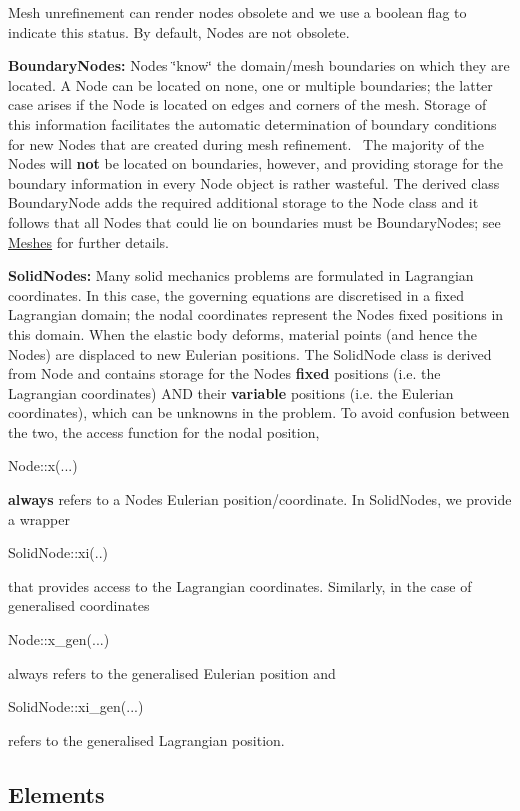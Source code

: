 \begin{DoxyItemize}
\item Mesh unrefinement can render nodes obsolete and we use a boolean flag to indicate this status. By default, {\ttfamily Nodes} are not obsolete.
\item {\bfseries Boundary\+Nodes\+:} {\ttfamily Nodes} \char`\"{}know\char`\"{} the domain/mesh boundaries on which they are located. A {\ttfamily Node} can be located on none, one or multiple boundaries; the latter case arises if the {\ttfamily Node} is located on edges and corners of the mesh. Storage of this information facilitates the automatic determination of boundary conditions for new {\ttfamily Nodes} that are created during mesh refinement.~\newline
 The majority of the {\ttfamily Nodes} will {\bfseries not} be located on boundaries, however, and providing storage for the boundary information in every {\ttfamily Node} object is rather wasteful. The derived class {\ttfamily Boundary\+Node} adds the required additional storage to the {\ttfamily Node} class and it follows that all {\ttfamily Nodes} that could lie on boundaries must be {\ttfamily Boundary\+Nodes}; see \hyperlink{index_meshes}{Meshes} for further details.
\item {\bfseries Solid\+Nodes\+:} Many solid mechanics problems are formulated in Lagrangian coordinates. In this case, the governing equations are discretised in a fixed Lagrangian domain; the nodal coordinates represent the {\ttfamily Nodes\textquotesingle{}} fixed positions in this domain. When the elastic body deforms, material points (and hence the {\ttfamily Nodes}) are displaced to new Eulerian positions. The {\ttfamily Solid\+Node} class is derived from {\ttfamily Node} and contains storage for the {\ttfamily Nodes\textquotesingle{}} {\bfseries fixed} positions (i.\+e. the Lagrangian coordinates) A\+ND their {\bfseries variable} positions (i.\+e. the Eulerian coordinates), which can be unknowns in the problem. To avoid confusion between the two, the access function for the nodal position,
\begin{DoxyCode}
Node::x(...) 
\end{DoxyCode}
 {\bfseries always} refers to a {\ttfamily Node\textquotesingle{}s} Eulerian position/coordinate. In {\ttfamily Solid\+Nodes}, we provide a wrapper
\begin{DoxyCode}
SolidNode::xi(..) 
\end{DoxyCode}
 that provides access to the Lagrangian coordinates. Similarly, in the case of generalised coordinates
\begin{DoxyCode}
Node::x\_gen(...) 
\end{DoxyCode}
 always refers to the generalised Eulerian position and
\begin{DoxyCode}
SolidNode::xi\_gen(...)
\end{DoxyCode}
 refers to the generalised Lagrangian position.
\end{DoxyItemize}\hypertarget{index_elements}{}\subsection{Elements}\label{index_elements}
